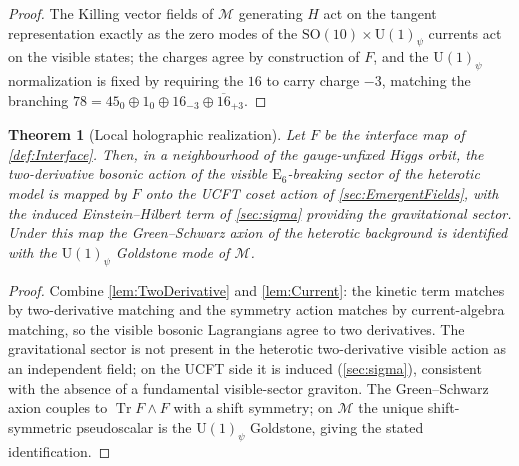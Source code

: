 \documentclass[pdflatex,sn-mathphys-num]{sn-jnl}
\theoremstyle{thmstyleone}
\newtheorem{theorem}{Theorem}
\theoremstyle{thmstyletwo}%
\theoremstyle{thmstylethree}%
\newcommand{\SO}[1]{\mathrm{SO(#1)}}
\newcommand{\U}[1]{\mathrm{U(#1)}}
\newcommand{\E}[1]{\mathrm{E_{#1}}}
\newcommand{\M}{\mathcal{M}}
\newcommand{\SOTen}{\SO{10}}
\newcommand{\UOne}{\U{1}}
\newcommand{\ESix}{\E{6}}
\newcommand{\Tr}{\operatorname{Tr}}
\begin{document}
\begin{proof}
The Killing vector fields of $\M$ generating $H$ act on the tangent
representation exactly as the zero modes of the $\SOTen\times\UOne_\psi$
currents act on the visible states; the charges agree by construction of $F$,
and the $\UOne_\psi$ normalization is fixed by requiring the $16$ to carry
charge $-3$, matching the branching $78=45_{0}\oplus1_{0}\oplus16_{-3}\oplus\overline{16}_{+3}$.
\end{proof}

\begin{theorem}[Local holographic realization]
\label{thm:Holographic}
Let $F$ be the interface map of \autoref{def:Interface}.  Then, in a
neighbourhood of the gauge-unfixed Higgs orbit, the two-derivative bosonic
action of the visible $\ESix$-breaking sector of the heterotic model is mapped by
$F$ onto the UCFT coset action of \autoref{sec:EmergentFields}, with the induced
Einstein--Hilbert term of \autoref{sec:sigma} providing the gravitational
sector.  Under this map the Green--Schwarz axion \cite{GreenSchwarz:1984} of the
heterotic background is identified with the $\UOne_\psi$ Goldstone mode of $\M$.
\end{theorem}

\begin{proof}
Combine \autoref{lem:TwoDerivative} and \autoref{lem:Current}: the kinetic term
matches by two-derivative matching and the symmetry action matches by
current-algebra matching, so the visible bosonic Lagrangians agree to two
derivatives.  The gravitational sector is not present in the heterotic
two-derivative visible action as an independent field; on the UCFT side it is
induced (\autoref{sec:sigma}), consistent with the absence of a fundamental
visible-sector graviton.  The Green--Schwarz axion couples to
$\Tr F\wedge F$ with a shift symmetry; on $\M$ the unique shift-symmetric
pseudoscalar is the $\UOne_\psi$ Goldstone, giving the stated identification.
\end{proof}
\end{document}
